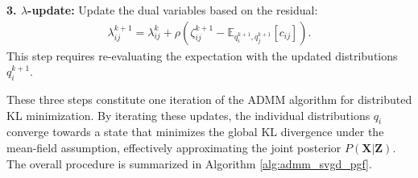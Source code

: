 \textbf{3. $\lambda$-update:} Update the dual variables based on the residual:
\begin{equation}
\begin{aligned}
\lambda_{ij}^{k+1} = \lambda_{ij}^k + \rho (\zeta_{ij}^{k+1} - \mathbb{E}_{q_i^{k+1}, q_j^{k+1}}[c_{ij}]).
\label{eq:admm_lambda_update_kl}
\end{aligned}
\end{equation}
This step requires re-evaluating the expectation with the updated distributions $q_i^{k+1}$.

These three steps constitute one iteration of the ADMM algorithm for distributed KL minimization. By iterating these updates, the individual distributions $q_i$ converge towards a state that minimizes the global KL divergence under the mean-field assumption, effectively approximating the joint posterior $P({\mathbf{X}} | {\mathbf{Z}})$. The overall procedure is summarized in Algorithm \ref{alg:admm_svgd_pgf}.

